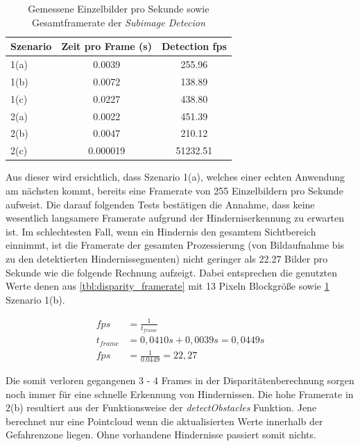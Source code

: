 \begin{table}[h]
\centering
\begin{tabular}{|l|c|c|}
\hline
Szenario & Zeit pro Frame (s) & Detection fps \\ \hline \hline
1(a)     & 0.0039                     & 255.96        \\ \hline
1(b)     & 0.0072                     & 138.89        \\ \hline
1(c)     & 0.0227                     & 438.80        \\ \hline \hline
2(a)     & 0.0022                     & 451.39        \\ \hline
2(b)     & 0.0047                     & 210.12        \\ \hline
2(c)     & 0.000019                   & 51232.51      \\ \hline
\end{tabular}
\caption{Gemessene Einzelbilder pro Sekunde sowie Gesamtframerate der \emph{Subimage Detecion}}
\label{tbl:subimage_framerate}
\end{table}

\noindent
Aus dieser wird ersichtlich, dass Szenario 1(a), welches einer echten Anwendung am nächsten kommt, bereits eine Framerate von 255 Einzelbildern pro Sekunde aufweist. Die darauf folgenden Tests bestätigen die Annahme, dass keine wesentlich langsamere Framerate aufgrund der Hinderniserkennung zu erwarten ist. Im schlechtesten Fall, wenn ein Hindernis den gesamtem Sichtbereich einnimmt, ist die Framerate der gesamten Prozessierung (von Bildaufnahme bis zu den detektierten Hindernissegmenten) nicht geringer als 22.27 Bilder pro Sekunde wie die folgende Rechnung aufzeigt. Dabei entsprechen die genutzten Werte denen aus \ref{tbl:disparity_framerate} mit 13 Pixeln Blockgröße sowie \ref{tbl:subimage_framerate} Szenario 1(b). 

\begin{equation}
\label{eq:fps_calculation}
\begin{aligned}
	fps &= \frac{1}{t_{frame}}\\
	t_{frame} &= 0,0410s + 0,0039s = 0,0449s\\
	fps &= \frac{1}{0.0449} = 22,27
\end{aligned}
\end{equation}

\noindent
Die somit verloren gegangenen 3 - 4 Frames in der Disparitätenberechnung sorgen noch immer für eine schnelle Erkennung von Hindernissen. Die hohe Framerate in 2(b) resultiert aus der Funktionsweise der \emph{detectObstacles} Funktion. Jene berechnet nur eine Pointcloud wenn die aktualisierten Werte innerhalb der Gefahrenzone liegen. Ohne vorhandene Hindernisse passiert somit nichts.\\

